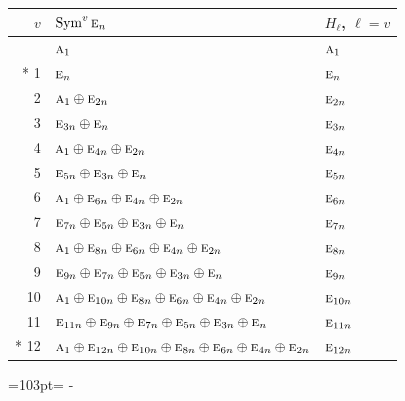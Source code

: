 \documentclass[10pt,a4paper]{article}
\newcommand{\needspace}[1]{\par\penalty-100\begingroup\dimen0=#1\relax\dimen2=\pagegoal
  \advance\dimen2-\pagetotal\ifdim\dimen0>\dimen2\relax\ifdim\dimen2>0pt\vfil\break\fi\fi
  \endgroup}
\numberwithin{equation}{section}
\newcommand{\irr}[1]{\text{\normalfont\scshape #1}}
\begin{document}
{\small\begin{longtable}{@{}rll@{}}\toprule
$v$ & $\operatorname{Sym}^{v}\irr{e}_{n}$ & $H_\ell$, $\ell = v$\\\midrule\endhead
\bottomrule\endfoot\endlastfoot
0 & $\irr{a}_{1}$ & $\irr{a}_{1}$\\*
1 & $\irr{e}_{n}$ & $\irr{e}_{n}$\\
2 & $\irr{a}_{1} \oplus \irr{e}_{2n}$ & $\irr{e}_{2n}$\\
3 & $\irr{e}_{3n} \oplus \irr{e}_{n}$ & $\irr{e}_{3n}$\\
4 & $\irr{a}_{1} \oplus \irr{e}_{4n} \oplus \irr{e}_{2n}$ & $\irr{e}_{4n}$\\
5 & $\irr{e}_{5n} \oplus \irr{e}_{3n} \oplus \irr{e}_{n}$ & $\irr{e}_{5n}$\\
6 & $\irr{a}_{1} \oplus \irr{e}_{6n} \oplus \irr{e}_{4n} \oplus \irr{e}_{2n}$ & $\irr{e}_{6n}$\\
7 & $\irr{e}_{7n} \oplus \irr{e}_{5n} \oplus \irr{e}_{3n} \oplus \irr{e}_{n}$ & $\irr{e}_{7n}$\\
8 & $\irr{a}_{1} \oplus \irr{e}_{8n} \oplus \irr{e}_{6n} \oplus \irr{e}_{4n} \oplus \irr{e}_{2n}$ & $\irr{e}_{8n}$\\
9 & $\irr{e}_{9n} \oplus \irr{e}_{7n} \oplus \irr{e}_{5n} \oplus \irr{e}_{3n} \oplus \irr{e}_{n}$ & $\irr{e}_{9n}$\\
10 & $\irr{a}_{1} \oplus \irr{e}_{10n} \oplus \irr{e}_{8n} \oplus \irr{e}_{6n} \oplus \irr{e}_{4n} \oplus \irr{e}_{2n}$ & $\irr{e}_{10n}$\\
11 & $\irr{e}_{11n} \oplus \irr{e}_{9n} \oplus \irr{e}_{7n} \oplus \irr{e}_{5n} \oplus \irr{e}_{3n} \oplus \irr{e}_{n}$ & $\irr{e}_{11n}$\\*
12 & $\irr{a}_{1} \oplus \irr{e}_{12n} \oplus \irr{e}_{10n} \oplus \irr{e}_{8n} \oplus \irr{e}_{6n} \oplus \irr{e}_{4n} \oplus \irr{e}_{2n}$ & $\irr{e}_{12n}$\\
\bottomrule\end{longtable}}
\needspace{103pt}
\end{document}

